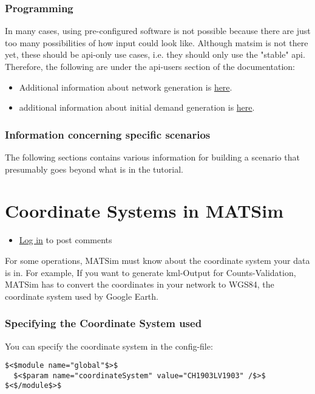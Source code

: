 \documentclass[a4paper,11pt]{report}
\begin{document}
\subsubsection{Programming}

In many cases, using pre-configured software is not possible because  there are just too many possibilities of how input could look like.  Although matsim is not there yet, these should be api-only use cases,  i.e. they should only use the "stable" api. Therefore, the  following are under the api-users section of the documentation:
\begin{itemize}
	\item Additional information about network generation is \href{http://matsim.org/node/588}{here}.
	\item additional information about initial demand generation is \href{http://matsim.org/node/340}{here}.
\end{itemize}

\subsubsection{Information concerning specific scenarios}

The following sections contains various information for building a scenario that presumably goes beyond what is in the tutorial.

\vfill\eject
\section{Coordinate Systems in MATSim}
\begin{itemize}
	\item \href{http://www.matsim.org/user/login?destination=comment/reply/405%23comment-form}{Log in} to post comments
\end{itemize}

For  some operations, MATSim must know about the coordinate system your data  is in. For example, If you want to generate kml-Output for  Counts-Validation, MATSim has to convert the coordinates in your network  to WGS84, the coordinate system used by Google Earth.


\subsubsection{Specifying the Coordinate System used}

You can specify the coordinate system in the config-file:
\begin{verbatim}
$<$module name="global"$>$
  $<$param name="coordinateSystem" value="CH1903LV1903" /$>$
$<$/module$>$
\end{verbatim}
\end{document}
